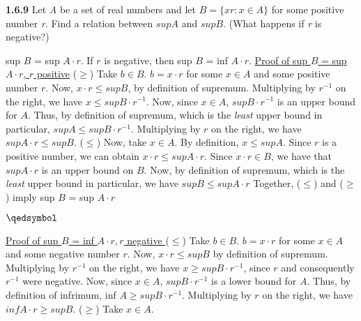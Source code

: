 \documentclass[12pt]{article}
\begin{document}
\begin{problem}\textbf{1.6.9}
Let \textit{A} be a set of real numbers and let $B=\{xr:x\in A\}$ for some positive number \textit{r}. Find a relation between $sup A$ and $sup B$. (What happens if \textit{r} is negative?)
\end{problem}
\begin{solution}
sup $B$ = sup $A\cdot r$. If $r$ is negative, then sup $B$ = inf $A\cdot r$.\newline
\underline{Proof of sup $B$ = sup $A\cdot r$, $r$ positive}\newline
($\geq$)
Take $b\in B$.\newline
$b=x\cdot r$ for some $x\in A$ and some positive number $r$.\newline
Now, $x\cdot r\leq sup B$, by definition of supremum.\newline
Multiplying by $r^{-1}$ on the right, we have $x\leq sup B\cdot r^{-1}$.\newline
Now, since $x\in A$, $sup B\cdot r^{-1}$ is an upper bound for $A$.\newline
Thus, by definition of supremum, which is the \textit{least} upper bound in particular,\newline
$sup A\leq sup B\cdot r^{-1}$.\newline
Multiplying by $r$ on the right, we have $sup A\cdot r\leq sup B$.\newline
($\leq$) Now, take $x\in A$.\newline
By definition, $x\leq sup A$.\newline
Since $r$ is a positive number, we can obtain $x\cdot r\leq sup A\cdot r$.\newline
Since $x\cdot r\in B$, we have that $sup A\cdot r$ is an upper bound on $B$.\newline
Now, by definition of supremum, which is the \textit{least} upper bound in particular, we have\newline
$supB\leq supA\cdot r$\newline
Together, ($\leq$) and ($\geq$) imply sup $B$ = sup $A\cdot r$
\begin{flushright}
$\qedsymbol$
\end{flushright}
\underline{Proof of sup $B$ = inf $A\cdot r, r$ negative }\newline
($\leq$) Take $b\in B$.\newline
$b=x\cdot r$ for some $x\in A$ and some negative number $r$.\newline
Now, $x\cdot r\leq sup B$ by definition of supremum.\newline
Multiplying by $r^{-1}$ on the right, we have $x\geq sup B\cdot r^{-1}$, since $r$ and consequently $r^{-1}$ were negative.\newline
Now, since $x\in A$, $supB\cdot r^{-1}$ is a lower bound for $A$.\newline
Thus, by definition of infrimum, inf $A\geq sup B\cdot r^{-1}$.\newline
Multiplying by $r$ on the right, we have $inf A\cdot r\geq supB$.\newline
($\geq$) Take $x\in A$.\newline


\end{solution}
\end{document}
